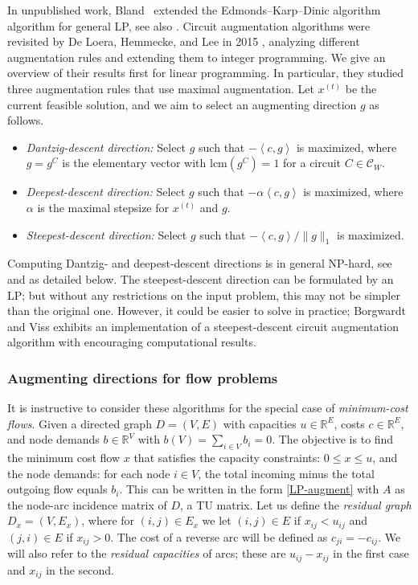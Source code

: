\documentclass[11pt, a4paper]{article}
\newcommand{\circuits}{\mathcal{C}}
\newcommand{\pr}[2]{\left\langle #1, #2 \right\rangle}
\newcommand{\1}{\mathbbm{1}}
\newcommand{\lcm}{\mathrm{lcm}}
\theoremstyle{case}
\newcommand{\R}{\mathbb{R}}
\begin{document}
\medskip

In unpublished work, Bland~\cite{Bland76} extended the Edmonds--Karp--Dinic algorithm \cite{dinic1970algorithm,Edmonds72} algorithm for general LP, see also \cite[Proposition 3.1]{Lee89}. Circuit augmentation algorithms were revisited by De Loera, Hemmecke, and Lee in 2015 \cite{DHL15}, analyzing different augmentation rules and extending them to integer programming. We give an overview of their results first for linear programming. In particular, they studied three augmentation rules that use maximal augmentation. Let  $x^{(t)}$ be the current feasible solution, and we aim to select an augmenting direction $g$ as follows.
\begin{itemize}
	\item \emph{Dantzig-descent direction:} Select $g$ such that $-\pr{c}{g}$ is maximized, where $g=g^C$ is the elementary vector with $\lcm(g^C)=1$ for a circuit $C\in \circuits_W$.
	\item \emph{Deepest-descent direction:} Select $g$ such that $-\alpha\pr{c}{g}$ is maximized, where $\alpha$ is the maximal stepsize for $x^{(t)}$ and $g$.
	\item \emph{Steepest-descent direction:} Select $g$ such that $-\pr{c}{g}/\|g\|_1$ is maximized.
\end{itemize}

Computing Dantzig- and deepest-descent directions is in general NP-hard, see \cite{DKS19} and  as detailed below. The steepest-descent direction can be formulated by an LP; but without any restrictions on the input problem, this may not be simpler than the original one. However, it could be easier to solve in practice; Borgwardt and Viss \cite{BorgwardtV2020} exhibits an implementation of a steepest-descent circuit augmentation algorithm with encouraging computational results.

\subsubsection{Augmenting directions for flow problems} 

 It is instructive to consider these algorithms  for the special case of \emph{minimum-cost flows}. Given a directed graph $D=(V,E)$ with capacities $u\in \R^E$, costs $c\in \R^E$, and node demands $b\in \R^V$ with $b(V)= \sum_{i \in V} b_i = 0$. The objective is to find the minimum cost flow $x$ that satisfies the capacity constraints: $0\le x\le u$, and the node demands: for each node $i\in V$, the total incoming minus the total outgoing flow equals $b_i$. This can be written in the form \ref{LP-augment} with $A$ as the node-arc incidence matrix of $D$, a TU matrix. 
Let us define the \emph{residual graph} $D_x=(V,E_x)$, where 
for $(i,j)\in E_x$ we let $(i,j)\in E$ if $x_{ij}<u_{ij}$ and $(j,i)\in E$ if $x_{ij}>0$. The cost of a reverse arc will be defined as $c_{ji}=-c_{ij}$. We will also refer to the \emph{residual capacities} of arcs; these are $u_{ij}-x_{ij}$ in the first case and $x_{ij}$ in the second. 
\end{document}
